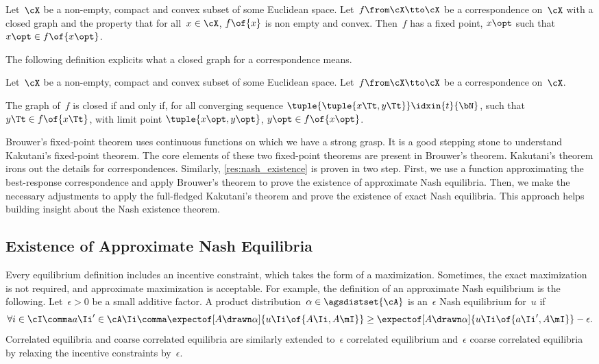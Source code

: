 \begin{theorem}
Let~\(\cX\) be a non-empty, compact and convex subset of some Euclidean space.
Let~\(f \from \cX \tto \cX\) be a correspondence on~\(\cX\) with a closed graph and the property that for all~\(x \in \cX\), \(f \of {x}\) is non empty and convex.
Then~\(f\) has a fixed point, \(x\opt\) such that~\(x\opt \in f \of {x\opt}\).
\end{theorem}

The following definition explicits what a closed graph for a correspondence means.

\begin{definition}
Let~\(\cX\) be a non-empty, compact and convex subset of some Euclidean space.
Let~\(f \from \cX \tto \cX\) be a correspondence on~\(\cX\).

The graph of~\(f\) is closed if and only if, for all converging sequence \(\tuple{\tuple{x\Tt, y\Tt}}\idxin{t}{\bN}\), such that~\(y\Tt \in f \of {x\Tt}\), with limit point \(\tuple{x\opt, y\opt}\), \(y\opt \in f \of {x\opt}\).
\end{definition}

Brouwer's fixed-point theorem uses continuous functions on which we have a strong grasp.
It is a good stepping stone to understand Kakutani's fixed-point theorem.
The core elements of these two fixed-point theorems are present in Brouwer's theorem.
Kakutani's theorem irons out the details for correspondences.
Similarly, \cref{res:nash_existence} is proven in  two step.
First, we use a function approximating the best-response correspondence and apply Brouwer's theorem to prove the existence of approximate Nash equilibria.
Then, we make the necessary adjustments to apply the full-fledged Kakutani's theorem and prove the existence of exact Nash equilibria.
This approach helps building insight about the Nash existence theorem.

\subsection{Existence of Approximate Nash Equilibria}

Every equilibrium definition includes an incentive constraint, which takes the form of a maximization.
Sometimes, the exact maximization is not required, and approximate maximization is acceptable.
For example, the definition of an approximate Nash equilibrium is the following.
Let~\(\epsilon > 0\) be a small additive factor.
A product distribution~\(\alpha \in \agsdistset{\cA}\) is an~\(\epsilon\) Nash equilibrium for~\(u\) if
\[
\forall i \in \cI \comma
a\Ii' \in \cA\Ii \comma
\expectof[A \drawn \alpha]{u\Ii \of{A\Ii, A\mI}}
\ge
\expectof[A \drawn \alpha]{u\Ii \of{a\Ii', A\mI}} - \epsilon
.
\]
Correlated equilibria and coarse correlated equilibria are similarly extended to~\(\epsilon\) correlated equilibrium and~\(\epsilon\) coarse correlated equilibria by relaxing the incentive constraints by~\(\epsilon\).

